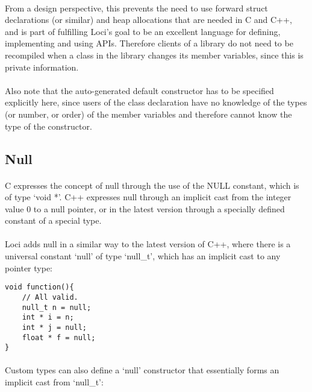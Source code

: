 \documentclass[12pt,twoside,notitlepage]{report}
\begin{document}
\paragraph{}
From a design perspective, this prevents the need to use forward struct declarations (or similar) and heap allocations that are needed in C and C++, and is part of fulfilling Loci's goal to be an excellent language for defining, implementing and using APIs. Therefore clients of a library do not need to be recompiled when a class in the library changes its member variables, since this is private information.

\paragraph{}
Also note that the auto-generated default constructor has to be specified explicitly here, since users of the class declaration have no knowledge of the types (or number, or order) of the member variables and therefore cannot know the type of the constructor.

\clearpage

\subsection{Null}

\paragraph{}
C expresses the concept of null through the use of the NULL constant, which is of type `void *'. C++ expresses null through an implicit cast from the integer value 0 to a null pointer, or in the latest version through a specially defined constant of a special type.

\paragraph{}
Loci adds null in a similar way to the latest version of C++, where there is a universal constant `null' of type `null\_t', which has an implicit cast to any pointer type:


\begin{lstlisting}
void function(){
	// All valid.
	null_t n = null;
	int * i = n;
	int * j = null;
	float * f = null;
}
\end{lstlisting}


\paragraph{}
Custom types can also define a `null' constructor that essentially forms an implicit cast from `null\_t':
\end{document}
